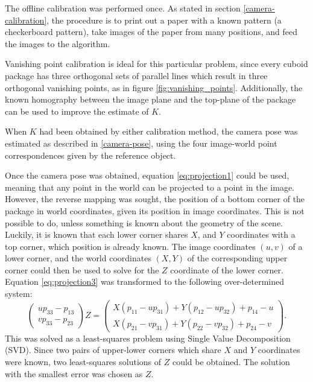 The offline calibration was performed once.
As stated in section \ref{camera-calibration}, the procedure is to print out a paper with a known pattern (a checkerboard pattern), take images of the paper from many positions, and feed the images to the algorithm.

Vanishing point calibration is ideal for this particular problem, since every cuboid package has three orthogonal sets of parallel lines which result in three orthogonal vanishing points, as in figure \ref{fig:vanishing_points}.
Additionally, the known homography between the image plane and the top-plane of the package can be used to improve the estimate of $K$.

When $K$ had been obtained by either calibration method, the camera pose was estimated as described in \ref{camera-pose}, using the four image-world point correspondences given by the reference object. %

Once the camera pose was obtained, equation \ref{eq:projection1} could be used, meaning that any point in the world can be projected to a point in the image.
However, the reverse mapping was sought, the position of a bottom corner of the package in world coordinates, given its position in image coordinates.
This is not possible to do, unless something is known about the geometry of the scene.
Luckily, it is known that each lower corner shares $X$, and $Y$ coordinates with a top corner, which position is already known.
The image coordinates $(u,v)$ of a lower corner, and the world coordinates $(X,Y)$ of the corresponding upper corner could then be used to solve for the $Z$ coordinate of the lower corner. 
Equation \ref{eq:projection3} was transformed to the following over-determined system:
\begin{equation} \label{eq:constrained-projection}
\begin{pmatrix} up_{33}-p_{13} \\ vp_{33}-p_{23} \end{pmatrix} Z = 
\begin{pmatrix}
X(p_{11}-up_{31}) + Y(p_{12}-up_{32})+p_{14}-u \\
X(p_{21}-vp_{31}) + Y(p_{22}-vp_{32})+p_{24}-v
\end{pmatrix}.
\end{equation}
This was solved as a least-squares problem using Single Value Decomposition (SVD).
Since two pairs of upper-lower corners which share $X$ and $Y$ coordinates were known, two least-squares solutions of $Z$ could be obtained.
The solution with the smallest error was chosen as $Z$.

